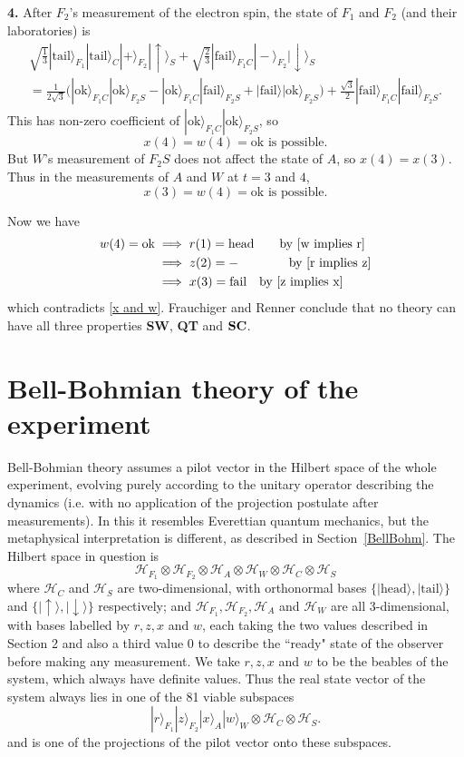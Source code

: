 \documentclass[12pt,a4paper,reqno]{article}
\newcommand{\head}{\text{head}}
\newcommand{\tail}{\text{tail}}
\newcommand{\ok}{\text{ok}}
\newcommand{\fail}{\text{fail}}
\newcommand{\be}{\begin{equation}}
\newcommand{\ee}{\end{equation}}
\renewcommand{\(}{\left(}
\renewcommand{\)}{\right)}
\renewcommand{\.}{\centerdot}
\newcommand{\1}{\mathbf{1}}
\renewcommand{\H}{\mathcal{H}}
\newcommand{\<}{\langle}
\renewcommand{\>}{\rangle}
\newcommand{\third}{\tfrac{1}{3}}
\theoremstyle{definition}
\theoremstyle{remark}
\numberwithin{equation}{section}
\newcommand{\secref}[1]{Section~\ref{#1}}
\begin{document}
{\bf 4.} After $F_2$'s measurement of the electron spin, the state of $F_1$ and $F_2$ (and their laboratories) is
\begin{multline*}
\sqrt{\third}|\tail\>_{F_1}|\tail\>_C|+\>_{F_2}|\uparrow\>_S + \sqrt{\tfrac{2}{3}}|\fail\>_{F_1C}|-\>_{F_2}|\downarrow\>_S\\
= \tfrac{1}{2\sqrt{3}}\big(|\ok\>_{F_1C}|\ok\>_{F_2S} - |\ok\>_{F_1C}|\fail\>_{F_2S} + |\fail\>|\ok\>_{F_2S}\big) + \tfrac{\sqrt{3}}{2}|\fail\>_{F_1C}|\fail\>_{F_2S}.
\end{multline*}
This has non-zero coefficient of $|\ok\>_{F_1C}|\ok\>_{F_2S}$, so
\[
x(4) = w(4) = \ok \text{ is possible.}
\]
But $W$'s measurement of $F_2S$ does not affect the state of $A$, so $x(4) = x(3)$. Thus in the measurements of $A$ and $W$ at $t = 3$ and $4$,
\be\label{x and w}
x(3) = w(4) = \ok \text{ is possible.}
\ee

Now we have
\begin{align*}
w(4) = \ok \; &\Longrightarrow \; r(1) = \head \qquad \text{by \eqref{w implies r}}\\
           &\Longrightarrow \; z(2) = - \qquad\qquad \text{by \eqref{r implies z}}\\
           &\Longrightarrow \; x(3) = \fail \quad \text{by \eqref{z implies x}}
\end{align*}
which contradicts \eqref{x and w}. Frauchiger and Renner conclude that no theory can have all three properties {\bf SW}, {\bf QT} and $\bf SC$.
\section{Bell-Bohmian theory of the experiment}\label{Bell-Bohm}

Bell-Bohmian theory assumes a pilot vector in the Hilbert space of the whole experiment, evolving purely according to the unitary operator describing the dynamics (i.e. with no application of the projection postulate after measurements). In this it resembles Everettian quantum mechanics, but the metaphysical interpretation is different, as described in \secref{BellBohm}. The Hilbert space in question is
\[
\H_{F_1}\otimes\H_{F_2}\otimes\H_A\otimes\H_W\otimes\H_C\otimes\H_S
\]
where $\H_C$ and $\H_S$ are two-dimensional, with orthonormal bases $\{|\head\>,|\tail\>\}$ and $\{|\uparrow\>, |\downarrow\>\}$ respectively; and $\H_{F_1}, \H_{F_2}, \H_A$ and $\H_W$ are all 3-dimensional, with bases labelled by $r, z, x$ and $w$, each taking the two values described in Section 2 and also a third value $0$ to describe the ``ready" state of the observer before making any measurement. We take $r, z, x$ and $w$ to be the beables of the system, which always have definite values. Thus the real state vector of the system always lies in one of the 81 viable subspaces
\[
|r\>_{F_1}|z\>_{F_2}|x\>_A|w\>_W\otimes\H_C\otimes\H_S.
\]
and is one of the projections of the pilot vector onto these subspaces.
\end{document}
